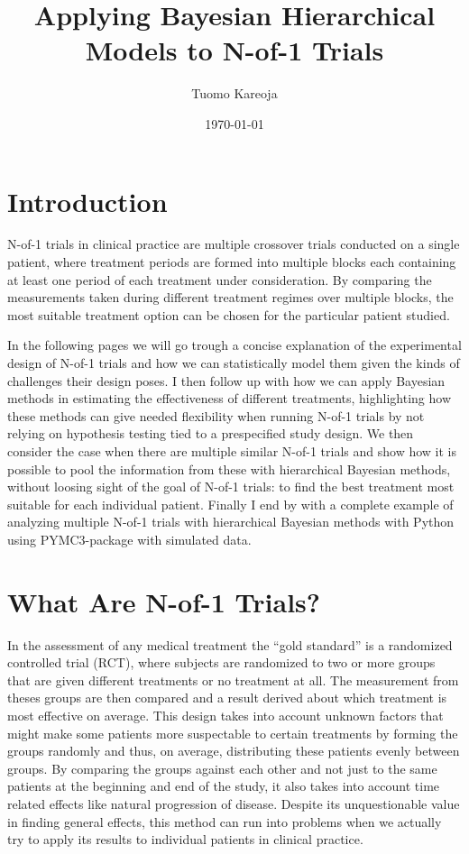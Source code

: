 \documentclass[12pt,a4paper,leqno]{report}
\title{Applying Bayesian Hierarchical Models to N-of-1 Trials}
\author{Tuomo Kareoja}
\date{\today}
\theoremstyle{plain}
\theoremstyle{definition}
\theoremstyle{remark}
\begin{document}
\maketitle

\tableofcontents

\chapter*{Introduction}\label{intro}

N-of-1 trials in clinical practice are multiple crossover trials conducted on a single
patient, where treatment periods are formed into multiple blocks each containing at least
one period of each treatment under consideration\cite{nofone}. By comparing the
measurements taken during different treatment regimes over multiple blocks, the most
suitable treatment option can be chosen for the particular patient studied.

In the following pages we will go trough a concise explanation of the experimental design
of N-of-1 trials and how we can statistically model them given the kinds of challenges
their design poses. I then follow up with how we can apply Bayesian methods in estimating
the effectiveness of different treatments, highlighting how these methods can give needed
flexibility when running N-of-1 trials by not relying on hypothesis testing tied to a
prespecified study design. We then consider the case when there are multiple similar
N-of-1 trials and show how it is possible to pool the information from these with
hierarchical Bayesian methods, without loosing sight of the goal of N-of-1 trials: to
find the best treatment most suitable for each individual patient. Finally I end by with
a complete example of analyzing multiple N-of-1 trials with hierarchical Bayesian methods
with Python using PYMC3-package with simulated data.

\chapter{What Are N-of-1 Trials?}\label{nof1}

In the assessment of any medical treatment the ``gold standard'' is a randomized
controlled trial (RCT), where subjects are randomized to two or more groups that are
given different treatments or no treatment at all. The measurement from theses groups are
then compared and a result derived about which treatment is most effective on average.
This design takes into account unknown factors that might make some patients more
suspectable to certain treatments by forming the groups randomly and thus, on average,
distributing these patients evenly between groups. By comparing the groups against each
other and not just to the same patients at the beginning and end of the study, it also
takes into account time related effects like natural progression of disease. Despite its
unquestionable value in finding general effects, this method can run into problems when
we actually try to apply its results to individual patients in clinical practice.
\end{document}
